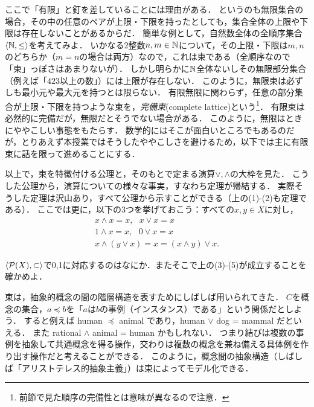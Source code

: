 \documentclass[11pt,a4paper]{jsarticle}
\begin{document}
\begin{attn}
ここで「有限」と釘を差していることには理由がある．
というのも無限集合の場合，その中の任意のペアが上限・下限を持ったとしても，集合全体の上限や下限は存在しないことがあるからだ．
簡単な例として，自然数全体の全順序集合$\langle \mathbb{N}, \leq \rangle$を考えてみよ．
いかなる2整数$n, m \in \mathbb{N}$について，その上限・下限は$m,n$のどちらか（$m=n$の場合は両方）なので，これは束である（全順序なので「束」っぽさはあまりないが）．
しかし明らかに$\mathbb{N}$全体ないしその無限部分集合（例えば「$423$以上の数」）には上限が存在しない．
このように，無限束は必ずしも最小元や最大元を持つとは限らない．
有限無限に関わらず，任意の部分集合が上限・下限を持つような束を，\emph{完備束}(complete lattice)という\footnote{前節で見た順序の完備性とは意味が異なるので注意．}．
有限束は必然的に完備だが，無限だとそうでない場合がある．
このように，無限はときにややこしい事態をもたらす．
数学的にはそこが面白いところでもあるのだが，とりあえず本授業ではそうしたややこしさを避けるため，以下では主に有限束に話を限って進めることにする． 
\end{attn}

以上で，束を特徴付ける公理と，そのもとで定まる演算$\vee, \wedge$の大枠を見た．
こうした公理から，演算についての様々な事実，すなわち定理が帰結する．
実際そうした定理は沢山あり，すべて公理から示すことができる（上の(1)-(2)も定理である）．
ここでは更に，以下の3つを挙げておこう：すべての$x, y \in X$に対し，
\begin{align}
 x \wedge x = x, \ \ \ x \vee x = x \\
 1 \wedge x = x, \ \ \ 0 \vee x = x \\
 x \wedge (y \vee x) = x = (x \wedge y) \vee x .
\end{align}

\begin{exercise}
 $\langle \mathcal{P}(X), \subset \rangle$で0,1に対応するのはなにか．またそこで上の(3)-(5)が成立することを確かめよ．
\end{exercise}


\begin{example}
束は，抽象的概念の間の階層構造を表すためにしばしば用いられてきた．
$C$を概念の集合，$a \preceq b$を「$a$は$b$の事例（インスタンス）である」という関係だとしよう．
すると例えば human $\preceq$ animal であり，human $\vee$ dog = mammal だといえる．
また rational $\wedge$ animal = human かもしれない．
つまり結びは複数の事例を抽象して共通概念を得る操作，交わりは複数の概念を兼ね備える具体例を作り出す操作だと考えることができる．
このように，概念間の抽象構造（しばしば「アリストテレス的抽象主義」）は束によってモデル化できる．
\end{example}
\end{document}
